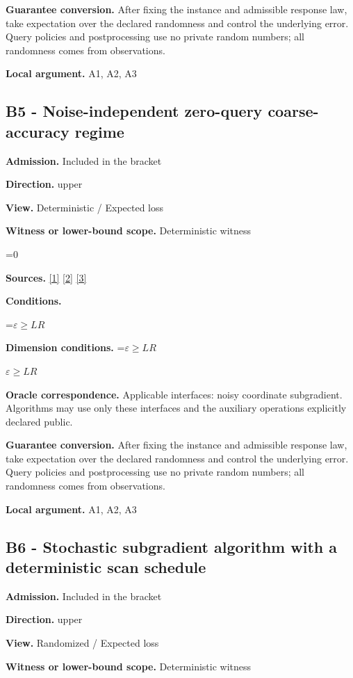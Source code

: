 \documentclass[10pt,a4paper]{article}
\newcommand{\AtlasMath}[1]{\par\begingroup\centering\setbox0=\hbox{$\displaystyle #1$}\ifdim\wd0>1.4\linewidth\typeout{ATLAS WIDE FORMULA: \the\wd0}\fi\ifdim\wd0>\linewidth\resizebox{\linewidth}{!}{\box0}\else\box0\fi\par\endgroup}
\newcommand{\AtlasInlineMath}[1]{\begingroup\setbox0=\hbox{$#1$}\ifdim\wd0>.4\linewidth\endgroup\AtlasMath{#1}\else\endgroup$#1$\fi}
\begin{document}
\textbf{Guarantee conversion.} After fixing the instance and admissible response law, take expectation over the declared randomness and control the underlying error. Query policies and postprocessing use no private random numbers; all randomness comes from observations.

\textbf{Local argument.} A1, A2, A3

\subsection{B5 - Noise-independent zero-query coarse-accuracy regime}
\textbf{Admission.} Included in the bracket

\textbf{Direction.} upper

\textbf{View.} Deterministic / Expected loss

\textbf{Witness or lower-bound scope.} Deterministic witness

\AtlasMath{0}
\textbf{Sources.} \href{https://arxiv.org/pdf/1405.4980}{[1]} \href{https://www2.isye.gatech.edu/~nemirovs/MOR_AccuracyCertificates.pdf}{[2]} \href{https://arxiv.org/pdf/2609.20701}{[3]}

\textbf{Conditions.} 
\AtlasMath{\varepsilon\ge LR}


\textbf{Dimension conditions.} \AtlasInlineMath{\varepsilon\ge LR}

\textbf{Oracle correspondence.} Applicable interfaces: noisy coordinate subgradient. Algorithms may use only these interfaces and the auxiliary operations explicitly declared public.

\textbf{Guarantee conversion.} After fixing the instance and admissible response law, take expectation over the declared randomness and control the underlying error. Query policies and postprocessing use no private random numbers; all randomness comes from observations.

\textbf{Local argument.} A1, A2, A3

\subsection{B6 - Stochastic subgradient algorithm with a deterministic scan schedule}
\textbf{Admission.} Included in the bracket

\textbf{Direction.} upper

\textbf{View.} Randomized / Expected loss

\textbf{Witness or lower-bound scope.} Deterministic witness
\end{document}
